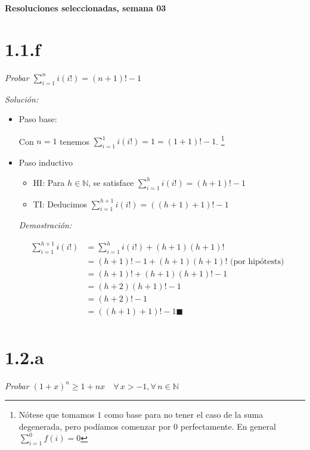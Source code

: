 \documentclass[10pt,a4paper]{article}
\newcommand{\qed}{\blacksquare}
\begin{document}
\vspace{0,3cm}

\begin{center}
{\bf \Large Resoluciones seleccionadas, semana 03}
\end{center}


\vspace{0,3cm}

\section*{1.1.f}\emph{Probar $\sum_{i=1}^n i(i!)= (n + 1)! - 1$}

\noindent
\emph{Solución:}

\begin{itemize}
\item Paso base:
  
  Con $n=1$ tenemos $\sum_{i=1}^1 i(i!)=1=(1+1)! -1$.
  \footnote{Nótese que tomamos $1$ como base para no tener el caso
    de la suma degenerada, pero podíamos comenzar por $0$ perfectamente.
  En general $\sum_{i=1}^0 f(i) = 0$}

\item Paso inductivo

  \begin{itemize}
  \item HI: Para $h\in \mathbb{N}$, se satisface
    $\sum_{i=1}^h i(i!)= (h + 1)! - 1$
  \item TI: Deducimos $\sum_{i=1}^{h+1} i(i!)= ((h + 1) + 1)! - 1$
  \end{itemize}
\emph{Demostración:}

\begin{align*}
  \sum_{i=1}^{h+1} i(i!)
  &= \sum_{i=1}^{h} i(i!) + (h+1)(h+1)! &\\
  &= (h+1)! - 1 + (h+1)(h+1)! {\text{ (por hipótests) } } &\\
  &= (h+1)! + (h+1)(h+1)! - 1 &\\
  &= (h+2)(h+1)! - 1 &\\
  &= (h+2)! - 1 &\\
  &= ((h + 1) + 1)! - 1  \qed &\\
\end{align*}
  
\end{itemize}





\section*{1.2.a}
\emph{Probar $(1+x)^n \geq 1+nx \quad \forall \, x>-1,
  \forall \, n \in \mathbb{N}$ }
\end{document}
